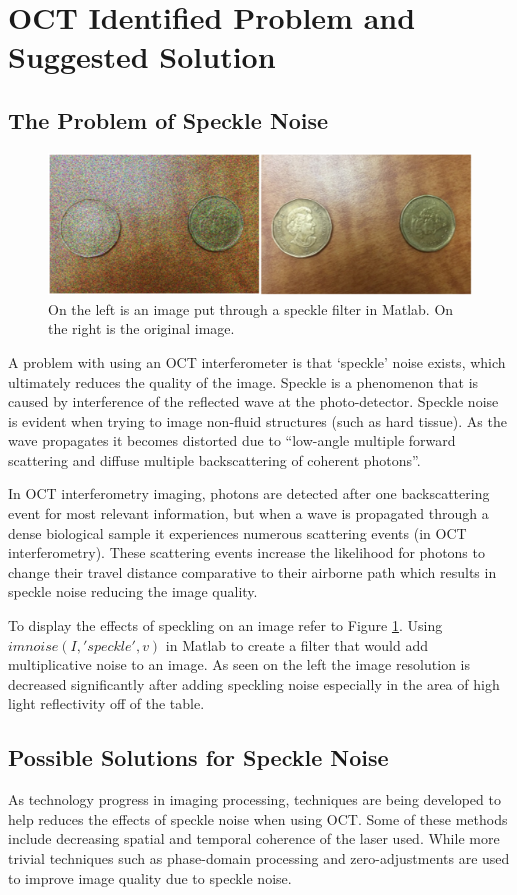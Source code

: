 \documentclass[%
reprint,
showpacs,preprintnumbers,
bibnotes,
amsmath,amssymb,
aps,
pra,
]{revtex4-1}
\begin{document}
	\section{\label{sec:level1}OCT Identified Problem and Suggested Solution}
	\subsection{\label{sec:level2} The Problem of Speckle Noise}
	\begin{figure}
		\centering
		\includegraphics[width=0.7\linewidth]{Figures/specklefilter2}
		\caption{On the left is an image put through a speckle filter in Matlab. On the right is the original image.}
		\label{fig:specklefilter2}
	\end{figure}
	A problem with using an OCT interferometer is that ‘speckle’ noise exists, which ultimately reduces the quality of the image. Speckle is a phenomenon that is caused by interference of the reflected wave at the photo-detector. Speckle noise is evident when trying to image non-fluid structures (such as hard tissue). As the wave propagates it becomes distorted due to “low-angle multiple forward scattering and diffuse multiple backscattering of coherent photons”. \cite{Popescu2007}

	In OCT interferometry imaging, photons are detected after one backscattering event for most relevant information, but when a wave is propagated through a dense biological sample it experiences numerous scattering events (in OCT interferometry). These scattering events increase the likelihood for photons to change their travel distance comparative to their airborne path which results in speckle noise reducing the image quality. \cite{Popescu2007}

	To display the effects of speckling on an image refer to Figure \ref{fig:specklefilter2}. Using $imnoise(I,'speckle',v)$ in Matlab to create a filter that would add multiplicative noise to an image. As seen on the left the image resolution is decreased significantly after adding speckling noise especially in the area of high light reflectivity off of the table.

	\subsection{\label{sec:level2} Possible Solutions for Speckle Noise}
	As technology progress in imaging processing, techniques are being developed to help reduces the effects of speckle noise when using OCT. Some of these methods include decreasing spatial and temporal coherence of the laser used. While more trivial techniques such as phase-domain processing and zero-adjustments are used to improve image quality due to speckle noise. \cite{Popescu2007}
\end{document}
